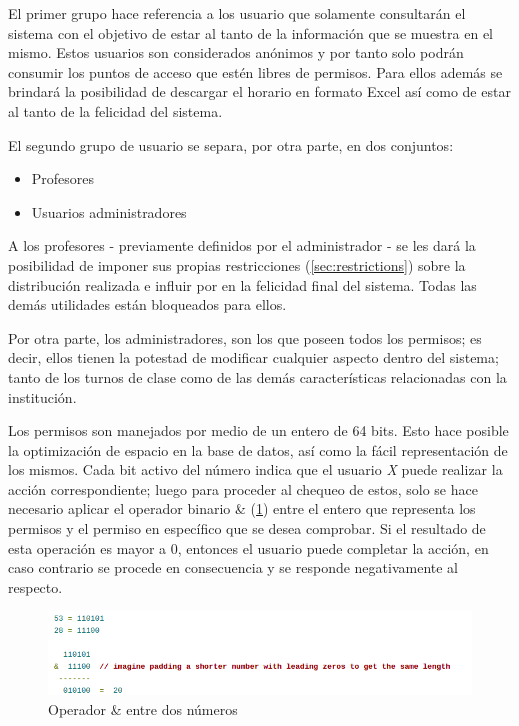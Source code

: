 El primer grupo hace referencia a los usuario que solamente consultarán el sistema con el objetivo de estar al tanto de la información que se muestra en el mismo. Estos usuarios son considerados anónimos y por tanto solo podrán consumir los puntos de acceso que estén libres de permisos. Para ellos además se brindará la posibilidad de descargar el horario en formato Excel así como de estar al tanto de la felicidad del sistema.

El segundo grupo de usuario se separa, por otra parte, en dos conjuntos:

\begin{itemize}
	\item Profesores
	\item Usuarios administradores
\end{itemize}

A los profesores - previamente definidos por el administrador - se les dará la posibilidad de imponer sus propias restricciones (\ref{sec:restrictions}) sobre la distribución realizada e influir por en la felicidad final del sistema. Todas las demás utilidades están bloqueados para ellos.

Por otra parte, los administradores, son los que poseen todos los permisos; es decir, ellos tienen la potestad de modificar cualquier aspecto dentro del sistema; tanto de los turnos de clase como de las demás características relacionadas con la institución.

Los permisos son manejados por medio de un entero de 64 bits. Esto hace posible la optimización de espacio en la base de datos, así como la fácil representación de los mismos. Cada bit activo del número indica que el usuario \textit{X} puede realizar la acción correspondiente; luego para proceder al chequeo de estos, solo se hace necesario aplicar el operador binario \& (\ref{fig:and}) entre el entero que representa los permisos y el permiso en específico que se desea comprobar. Si el resultado de esta operación es mayor a 0, entonces el usuario puede completar la acción, en caso contrario se procede en consecuencia  y se responde negativamente al respecto.

\begin{figure}[h!]
	\centering
	\includegraphics[width=0.95\linewidth]{images/Chapter 3/and}
	\caption{Operador \& entre dos números \cite{codeforces}}
	\label{fig:and}
\end{figure}

